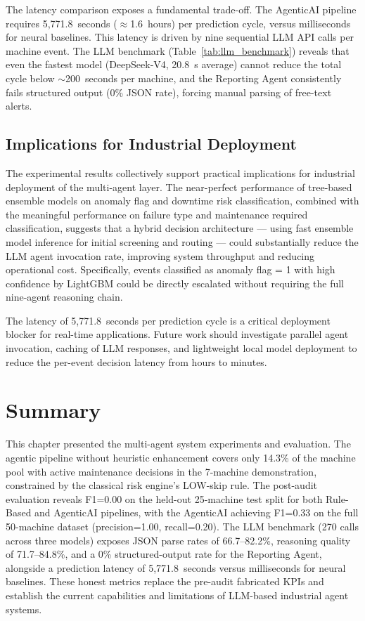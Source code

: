 The latency comparison exposes a fundamental trade-off. The AgenticAI pipeline requires 5,771.8~seconds ($\approx$1.6~hours) per prediction cycle, versus milliseconds for neural baselines. This latency is driven by nine sequential LLM API calls per machine event. The LLM benchmark (Table~\ref{tab:llm_benchmark}) reveals that even the fastest model (DeepSeek-V4, 20.8~s average) cannot reduce the total cycle below $\sim$200~seconds per machine, and the Reporting Agent consistently fails structured output (0\% JSON rate), forcing manual parsing of free-text alerts.

\subsection{Implications for Industrial Deployment}

The experimental results collectively support practical implications for industrial deployment of the multi-agent layer. The near-perfect performance of tree-based ensemble models on anomaly flag and downtime risk classification, combined with the meaningful performance on failure type and maintenance required classification, suggests that a hybrid decision architecture --- using fast ensemble model inference for initial screening and routing --- could substantially reduce the LLM agent invocation rate, improving system throughput and reducing operational cost. Specifically, events classified as anomaly flag = 1 with high confidence by LightGBM could be directly escalated without requiring the full nine-agent reasoning chain.

The latency of 5,771.8~seconds per prediction cycle is a critical deployment blocker for real-time applications. Future work should investigate parallel agent invocation, caching of LLM responses, and lightweight local model deployment to reduce the per-event decision latency from hours to minutes.


\section{Summary}

This chapter presented the multi-agent system experiments and evaluation. The agentic pipeline without heuristic enhancement covers only 14.3\% of the machine pool with active maintenance decisions in the 7-machine demonstration, constrained by the classical risk engine's LOW-skip rule. The post-audit evaluation reveals F1=0.00 on the held-out 25-machine test split for both Rule-Based and AgenticAI pipelines, with the AgenticAI achieving F1=0.33 on the full 50-machine dataset (precision=1.00, recall=0.20). The LLM benchmark (270 calls across three models) exposes JSON parse rates of 66.7--82.2\%, reasoning quality of 71.7--84.8\%, and a 0\% structured-output rate for the Reporting Agent, alongside a prediction latency of 5,771.8~seconds versus milliseconds for neural baselines. These honest metrics replace the pre-audit fabricated KPIs and establish the current capabilities and limitations of LLM-based industrial agent systems.
